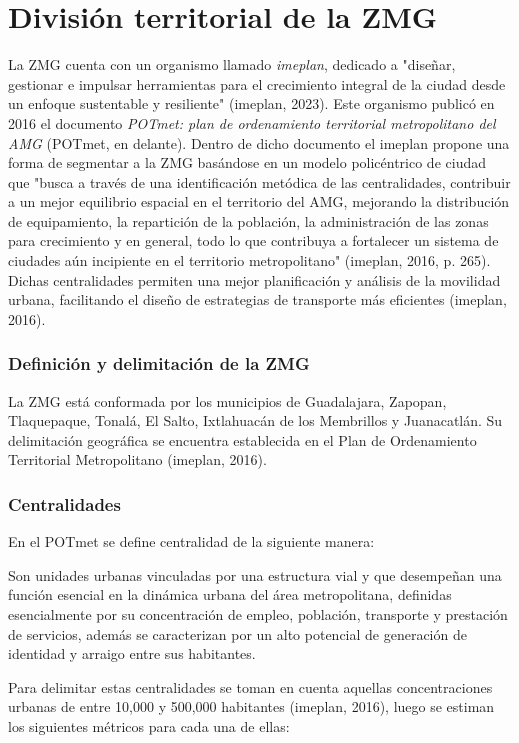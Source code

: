 \documentclass[openany]{book}
\begin{document}
	\section{División territorial de la ZMG}
		La ZMG cuenta con un organismo llamado \textit{imeplan}, dedicado a "diseñar, gestionar e impulsar herramientas para el crecimiento integral de la ciudad desde un enfoque sustentable y resiliente" (imeplan, 2023). Este organismo publicó en 2016 el documento \textit{POTmet: plan de ordenamiento territorial metropolitano del AMG} (POTmet, en delante). Dentro de dicho documento el imeplan propone una forma de segmentar a la ZMG basándose en un modelo policéntrico de ciudad que "busca a través de una identificación metódica de las centralidades, contribuir a un mejor equilibrio espacial en el territorio del AMG, mejorando la distribución de equipamiento, la repartición de la población, la administración de las zonas para crecimiento y en general, todo lo que contribuya a fortalecer un sistema de ciudades aún incipiente en el territorio metropolitano" (imeplan, 2016, p. 265). Dichas centralidades permiten una mejor planificación y análisis de la movilidad urbana, facilitando el diseño de estrategias de transporte más eficientes (imeplan, 2016).

			\subsubsection{Definición y delimitación de la ZMG}
				La ZMG está conformada por los municipios de Guadalajara, Zapopan, Tlaquepaque, Tonalá, El Salto, Ixtlahuacán de los Membrillos y Juanacatlán.
				Su delimitación geográfica se encuentra establecida en el Plan de Ordenamiento Territorial Metropolitano (imeplan, 2016).

			\subsubsection{Centralidades}
				En el POTmet se define centralidad de la siguiente manera:
				\begin{center}
					Son unidades urbanas vinculadas por una estructura vial y que desempeñan una función esencial en la dinámica urbana del área metropolitana, definidas esencialmente por su concentración de empleo, población, transporte y prestación de servicios, además se caracterizan por un alto potencial de generación de identidad y arraigo entre sus habitantes.
				\end{center}
				Para delimitar estas centralidades se toman en cuenta aquellas concentraciones urbanas de entre 10,000 y 500,000 habitantes (imeplan, 2016), luego se estiman los siguientes métricos para cada una de ellas:
\end{document}
